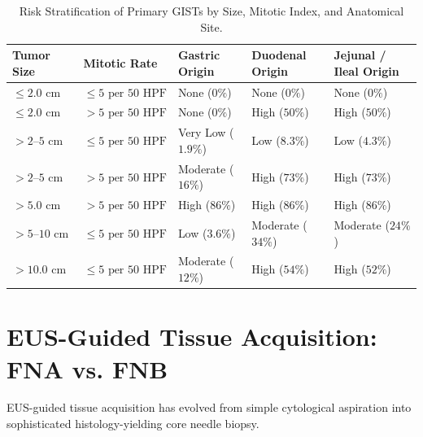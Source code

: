 \documentclass[11pt,a4paper]{article}
\begin{document}
\begin{table}[htbp]
\centering
\small
\setlength{\tabcolsep}{3pt}
\caption{Risk Stratification of Primary GISTs by Size, Mitotic Index, and Anatomical Site.}
\label{tab:gist_risk}
\begin{tabular}{p{2.6cm} p{2.8cm} p{2.6cm} p{3.2cm} p{3.2cm}}
\toprule
\textbf{Tumor Size} & \textbf{Mitotic Rate} & \textbf{Gastric Origin} & \textbf{Duodenal Origin} & \textbf{Jejunal / Ileal Origin} \\
\midrule
$\le 2.0\text{ cm}$ & $\le 5\text{ per } 50\text{ HPF}$ & None ($0\%$) & None ($0\%$) & None ($0\%$) \\
\addlinespace
$\le 2.0\text{ cm}$ & $> 5\text{ per } 50\text{ HPF}$ & None ($0\%$) & High ($50\%$) & High ($50\%$) \\
\addlinespace
$> 2\text{--}5\text{ cm}$ & $\le 5\text{ per } 50\text{ HPF}$ & Very Low ($1.9\%$) & Low ($8.3\%$) & Low ($4.3\%$) \\
\addlinespace
$> 2\text{--}5\text{ cm}$ & $> 5\text{ per } 50\text{ HPF}$ & Moderate ($16\%$) & High ($73\%$) & High ($73\%$) \\
\addlinespace
$> 5.0\text{ cm}$ & $> 5\text{ per } 50\text{ HPF}$ & High ($86\%$) & High ($86\%$) & High ($86\%$) \\
\addlinespace
$> 5\text{--}10\text{ cm}$ & $\le 5\text{ per } 50\text{ HPF}$ & Low ($3.6\%$) & Moderate ($34\%$) & Moderate ($24\%$) \\
\addlinespace
$> 10.0\text{ cm}$ & $\le 5\text{ per } 50\text{ HPF}$ & Moderate ($12\%$) & High ($54\%$) & High ($52\%$) \\
\bottomrule
\end{tabular}
\end{table}

\section{EUS-Guided Tissue Acquisition: FNA vs. FNB}
EUS-guided tissue acquisition has evolved from simple cytological aspiration into sophisticated histology-yielding core needle biopsy.
\end{document}
